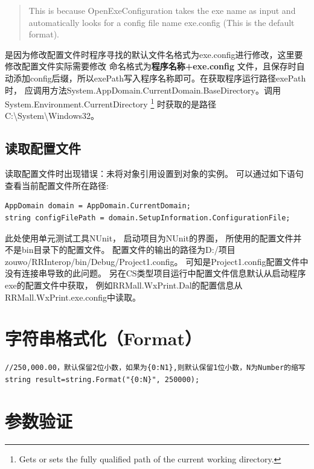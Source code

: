 \documentclass{book}
\begin{document}
\begin{quote}
This is because OpenExeConfiguration takes the exe name as input and automatically 
looks for a config file name exe.config (This is the default format).
\end{quote}

是因为修改配置文件时程序寻找的默认文件名格式为exe.config进行修改，这里要修改配置文件实际需要修改
命名格式为\textbf{程序名称+exe.config}
文件，且保存时自动添加config后缀，所以exePath写入程序名称即可。在获取程序运行路径exePath时，
应调用方法System.AppDomain.CurrentDomain.BaseDirectory。调用System.Environment.CurrentDirectory
\footnote{Gets or sets the fully qualified path of the current working directory.}
时获取的是路径C:\textbackslash System\textbackslash Windows32。

\subsection{读取配置文件}

读取配置文件时出现错误：未将对象引用设置到对象的实例。
可以通过如下语句查看当前配置文件所在路径:

\begin{lstlisting}[language={[Sharp]C}]
AppDomain domain = AppDomain.CurrentDomain;
string configFilePath = domain.SetupInformation.ConfigurationFile;
\end{lstlisting}

此处使用单元测试工具NUnit，
启动项目为NUnit的界面，
所使用的配置文件并不是bin目录下的配置文件。
配置文件的输出的路径为D:/项目zouwo/RRInterop/bin/Debug/Project1.config。
可知是Project1.config配置文件中没有连接串导致的此问题。
另在CS类型项目运行中配置文件信息默认从启动程序exe的配置文件中获取，
例如RRMall.WxPrint.Dal的配置信息从RRMall.WxPrint.exe.config中读取。

\section{字符串格式化（Format）}

\begin{lstlisting}[language={[Sharp]C}]
//250,000.00，默认保留2位小数，如果为{0:N1},则默认保留1位小数，N为Number的缩写
string result=string.Format("{0:N}", 250000);
\end{lstlisting}

\section{参数验证}
\end{document}

